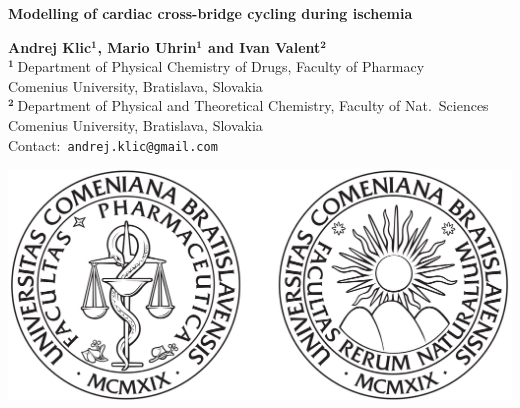 \documentclass[a0,portrait]{a0poster}
\begin{document}

\begin{center}
{\veryHuge \color{NavyBlue} \textbf{Modelling of cardiac cross-bridge
cycling during ischemia}\\ [2cm]}%
\end{center}
\begin{minipage}[b]{0.63\linewidth}
\huge \textbf{Andrej Klic$\mathbf{^1}$, Mario
    Uhrin$\mathbf{^1}$ and Ivan Valent$\mathbf{^2}$}\\[0.4cm] %
\Large $\mathbf{^1~}$Department of Physical Chemistry of Drugs, Faculty of Pharmacy\\
Comenius University, Bratislava, Slovakia \\[0.2cm]
\Large $\mathbf{^2~}$Department of Physical and Theoretical Chemistry, Faculty of Nat.~Sciences\\
Comenius University, Bratislava, Slovakia\\[0.2cm]
\Large Contact:~\texttt{andrej.klic@gmail.com}\\
\end{minipage}
%
\begin{minipage}[b]{0.45\linewidth}
\includegraphics[scale=0.45]{faf-prif_logos}\\
\end{minipage}
\end{document}
